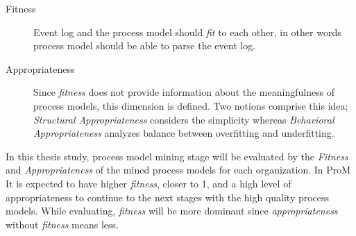 \begin{description}
  \item[Fitness] Event log and the process model should \textit{fit} to each other, in other words process model should be able to parse the event log. 
  \item[Appropriateness] Since \textit{fitness} does not provide information about the meaningfulness of process models, this dimension is defined. Two notions comprise this idea; \textit{Structural Appropriateness} considers the simplicity whereas \textit{Behavioral Appropriateness} analyzes balance between overfitting and underfitting.
\end{description}

In this thesis study, process model mining stage will be evaluated by the \textit{Fitness} and \textit{Appropriateness} of the mined process models for each organization. In ProM  It is expected to have higher \textit{fitness}, closer to 1, and a high level of appropriateness to continue to the next stages with the high quality process models. While evaluating, \textit{fitness} will be more dominant since \textit{appropriateness} without \textit{fitness} means less.
